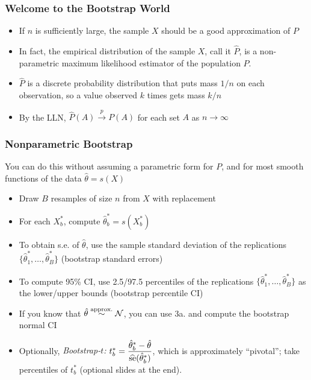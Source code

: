 \documentclass[xcolor=svgnames,9pt,english,aspectratio=169,t]{beamer}
\begin{document}
\begin{frame}
\frametitle{Welcome to the Bootstrap World}

\vspace{-.15in}
\begin{itemize}[<+->]
\addtolength{\itemsep}{.5\baselineskip}
\item If $n$ is sufficiently large, the sample
  $X$ should be a good approximation of $P$
\item In fact, the empirical distribution of the sample $X$, call it $\hat{P}$, is a non-parametric maximum likelihood estimator of the population $P$.
\item $\hat{P}$ is a discrete probability distribution that puts mass $1/n$ on each observation, so a value observed $k$ times gets mass $k/n$
\item By the LLN, $\hat{P}(A) \xrightarrow{p} P(A)$ for each set $A$ as $n \longrightarrow \infty$
\end{itemize}
\end{frame}





\begin{frame}
\frametitle{Nonparametric Bootstrap}
You can do this without assuming a parametric form for $P$, and for most smooth
      functions of the data $\hat\theta = s(X)$\medskip
\begin{itemize}[<+->]
\item[1.] Draw $B$ resamples of size $n$ from $X$ with replacement
\item[2.] For each $X_b^\ast$, compute $\hat\theta_b^\ast = s(X_b^\ast)$
\item[3a.] To obtain s.e. of $\hat\theta$, use the sample standard deviation
      of the replications $\{\hat\theta_1^\ast, \ldots, \hat\theta_B^\ast\}$
      (\alert{bootstrap standard errors})
\item[3b.] To compute 95\% CI, use 2.5/97.5 percentiles
      of the replications $\{\hat\theta_1^\ast, \ldots, \hat\theta_B^\ast\}$
      as the lower/upper bounds
      (\alert{bootstrap percentile CI})
\item[3c.] If you know that $\hat\theta \stackrel{{\rm approx.}}{\sim} \mathcal{N}$,
        you can use 3a. and compute the \alert{bootstrap normal CI}
\item[3d.] Optionally, \emph{Bootstrap-$t$:} $t_b^\ast=\dfrac{\hat\theta_b^\ast-\hat\theta}{\widehat{\rm se}(\hat\theta_b^\ast)}$, which is approximately ``pivotal''; take percentiles of ${t_b^\ast}$ (optional slides at the end).
\end{itemize}
\end{frame}
\end{document}
